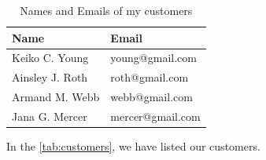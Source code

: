 \documentclass[a4paper,12pt]{article}
\begin{document}
\begin{table}[htb!]
	\renewcommand{\arraystretch}{1.25}
	\centering
	\begin{tabular}{|l|l|}
		\hline
		\textbf{Name}   & \textbf{Email}                     \\ \hline
		Keiko C. Young  &  young@gmail.com    \\
		Ainsley J. Roth & roth@gmail.com \\
		Armand M. Webb  &  webb@gmail.com\\
		Jana G. Mercer  &  mercer@gmail.com     \\ \hline
	\end{tabular}
\caption{Names and Emails of my customers}
\label{tab:customers}
\end{table}

In the \autoref{tab:customers}, we have listed our customers.







\end{document}
